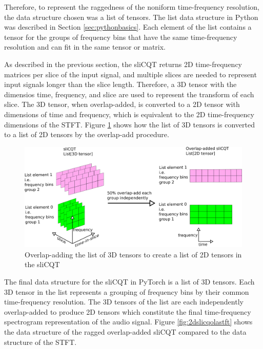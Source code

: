 \documentclass[report.tex]{subfiles}
\begin{document}
Therefore, to represent the raggedness of the noniform time-frequency resolution, the data structure chosen was a list of tensors. The list data structure in Python was described in Section \ref{sec:pythonbasics}. Each element of the list contains a tensor for the groups of frequency bins that have the same time-frequency resolution and can fit in the same tensor or matrix.

As described in the previous section, the sliCQT returns 2D time-frequency matrices per slice of the input signal, and multiple slices are needed to represent input signals longer than the slice length. Therefore, a 3D tensor with the dimensios time, frequency, and slice are used to represent the transform of each slice. The 3D tensor, when overlap-added, is converted to a 2D tensor with dimensions of time and frequency, which is equivalent to the 2D time-frequency dimensions of the STFT. Figure \ref{fig:3dslicqola2d} shows how the list of 3D tensors is converted to a list of 2D tensors by the overlap-add procedure.

\begin{figure}[ht]
	\centering
	\includegraphics[width=\textwidth]{./images-blockdiagrams/3dslicqola2d.png}
	\caption{Overlap-adding the list of 3D tensors to create a list of 2D tensors in the sliCQT}
	\label{fig:3dslicqola2d}
\end{figure}

The final data structure for the sliCQT in PyTorch is a list of 3D tensors. Each 3D tensor in the list represents a grouping of frequency bins by their common time-frequency resolution. The 3D tensors of the list are each independently overlap-added to produce 2D tensors which constitute the final time-frequency spectrogram representation of the audio signal. Figure \ref{fig:2dslicqolastft} shows the data structure of the ragged overlap-added sliCQT compared to the data structure of the STFT.
\end{document}
